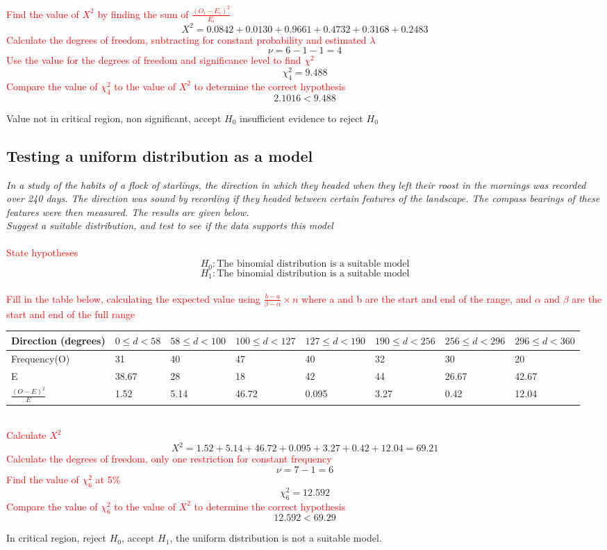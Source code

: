 \documentclass{article}[18pt]
\begin{document}
\textcolor{red}{Find the value of $X^2$ by finding the sum of $\frac{(O_i-E_i)^2}{E_i}$}
$$X^2=0.0842+0.0130+0.9661+0.4732+0.3168+0.2483$$
\textcolor{red}{Calculate the degrees of freedom, subtracting for constant probability and estimated $\lambda$}
$$\nu=6-1-1=4$$
\textcolor{red}{Use the value for the degrees of freedom and significance level to find $\chi^2$}
$$\chi^2_4=9.488$$
\textcolor{red}{Compare the value of $\chi_4^2$ to the value of $X^2$ to determine the correct hypothesis}
$$2.1016<9.488$$
\begin{center}
Value not in critical region, non significant, accept $H_0$ insufficient evidence to reject $H_0$
\end{center}
\newpage
\subsection{Testing a uniform distribution as a model}
\textit{In a study of the habits of a flock of starlings, the direction in which they headed when they left their roost in the mornings was recorded over 240 days. The direction was sound by recording if they headed between certain features of the landscape. The compass bearings of these features were then measured. The results are given below.\\
Suggest a suitable distribution, and test to see if the data supports this model}\\
\\
\textcolor{red}{State hypotheses}
$$H_0:\textrm{The binomial distribution is a suitable model}$$
$$H_1:\textrm{The binomial distribution is a suitable model}$$
\\
\textcolor{red}{Fill in the table below, calculating the expected value using $\frac{b-a}{\beta-\alpha}\times n$ where a and b are the start and end of the range, and $\alpha$ and $\beta$ are the start and end of the full range}\\
\begin{tabularx}{\textwidth}{|X|X|X|X|X|X|X|X|}
\hline
Direction (degrees)&$0\leqslant d<58$&$58\leqslant d<100$&$100\leqslant d<127$&$127\leqslant d<190$&$190\leqslant d<256$&$256\leqslant d<296$&$296\leqslant d<360$\\
\hline
Frequency(O)&31&40&47&40&32&30&20\\
\hline
E&38.67&28&18&42&44&26.67&42.67\\
\hline
$\frac{(O-E)^2}{E}$&1.52&5.14&46.72&0.095&3.27&0.42&12.04\\
\hline
\end{tabularx}\\
\textcolor{red}{Calculate $X^2$}
$$X^2=1.52+5.14+46.72+0.095+3.27+0.42+12.04=69.21$$
\textcolor{red}{Calculate the degrees of freedom, only one restriction for constant frequency}
$$\nu=7-1=6$$
\textcolor{red}{Find the value of $\chi^2_6$ at 5\%}
$$\chi^2_6=12.592$$
\textcolor{red}{Compare the value of $\chi^2_6$ to the value of $X^2$ to determine the correct hypothesis}
$$12.592<69.29$$
\begin{center}
In critical region, reject $H_0$, accept $H_1$, the uniform distribution is not a suitable model.
\end{center}
\newpage
\end{document}
